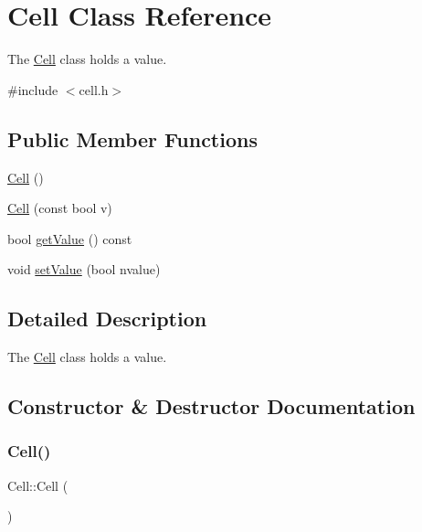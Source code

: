\hypertarget{class_cell}{}\section{Cell Class Reference}
\label{class_cell}


The \mbox{\hyperlink{class_cell}{Cell}} class holds a value.  




{\ttfamily \#include $<$cell.\+h$>$}

\subsection*{Public Member Functions}
\begin{DoxyCompactItemize}
\item 
\mbox{\hyperlink{class_cell_a394510643e8664cf12b5efaf5cb99f71}{Cell}} ()
\item 
\mbox{\hyperlink{class_cell_a2ab5845d5581d0f860e496da292993d6}{Cell}} (const bool v)
\item 
bool \mbox{\hyperlink{class_cell_af0ff17e13f236d36b3623c16909d2eff}{get\+Value}} () const
\item 
void \mbox{\hyperlink{class_cell_afc72dd1488c81e51aeb954ba7233e4aa}{set\+Value}} (bool nvalue)
\end{DoxyCompactItemize}


\subsection{Detailed Description}
The \mbox{\hyperlink{class_cell}{Cell}} class holds a value. 

\subsection{Constructor \& Destructor Documentation}
\mbox{\label{class_cell_a394510643e8664cf12b5efaf5cb99f71}} 
\subsubsection{\texorpdfstring{Cell()}{Cell()}\hspace{0.1cm}{\footnotesize\ttfamily [1/2]}}
{\footnotesize\ttfamily Cell\+::\+Cell (\begin{DoxyParamCaption}{ }\end{DoxyParamCaption})\hspace{0.3cm}{\ttfamily [inline]}}

